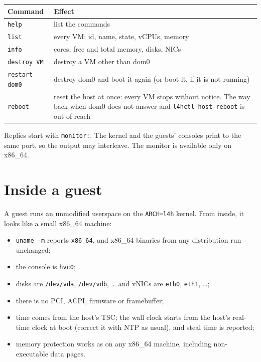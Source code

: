 \documentclass[11pt,a4paper]{report}
\newcommand{\cmd}[1]{\texttt{#1}}
\newcommand{\file}[1]{\texttt{#1}}
\begin{document}
\begin{longtable}{@{}lp{10cm}@{}}
\toprule
Command & Effect \\
\midrule
\texttt{help} & list the commands \\
\texttt{list} & every VM: id, name, state, vCPUs, memory \\
\texttt{info} & cores, free and total memory, disks, NICs \\
\texttt{destroy VM} & destroy a VM other than dom0 \\
\texttt{restart-dom0} & destroy dom0 and boot it again (or boot it, if it
  is not running) \\
\texttt{reboot} & reset the host at once: every VM stops without notice.
  The way back when dom0 does not answer and \cmd{l4hctl host-reboot} is
  out of reach \\
\bottomrule
\end{longtable}

Replies start with \texttt{monitor:}. The kernel and the guests' consoles
print to the same port, so the output may interleave. The monitor is
available only on x86\_64.

\chapter{Inside a guest}
\label{ch:guest}

A guest runs an unmodified userspace on the \texttt{ARCH=l4h} kernel. From
inside, it looks like a small x86\_64 machine:
\begin{itemize}
  \item \texttt{uname -m} reports \texttt{x86\_64}, and x86\_64 binaries
        from any distribution run unchanged;
  \item the console is \texttt{hvc0};
  \item disks are \file{/dev/vda}, \file{/dev/vdb}, \ldots{} and vNICs are
        \texttt{eth0}, \texttt{eth1}, \ldots;
  \item there is no PCI, ACPI, firmware or framebuffer;
  \item time comes from the host's TSC; the wall clock starts from the
        host's real-time clock at boot (correct it with NTP as usual), and
        steal time is reported;
  \item memory protection works as on any x86\_64 machine, including
        non-executable data pages.
\end{itemize}
\end{document}
